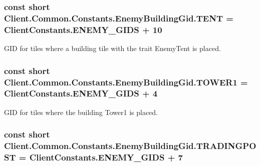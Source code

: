 \subsubsection[{T\+E\+N\+T}]{\setlength{\rightskip}{0pt plus 5cm}const short Client.\+Common.\+Constants.\+Enemy\+Building\+Gid.\+T\+E\+N\+T = {\bf Client\+Constants.\+E\+N\+E\+M\+Y\+\_\+\+G\+I\+D\+S} + 10}\label{classClient_1_1Common_1_1Constants_1_1EnemyBuildingGid_a296e67edf8d5e701bce6602512f1eb82}


G\+I\+D for tiles where a building tile with the trait Enemy\+Tent is placed. 

\hypertarget{classClient_1_1Common_1_1Constants_1_1EnemyBuildingGid_a895248f7ed0edbdb9109008ad0d69bac}{}
\subsubsection[{T\+O\+W\+E\+R1}]{\setlength{\rightskip}{0pt plus 5cm}const short Client.\+Common.\+Constants.\+Enemy\+Building\+Gid.\+T\+O\+W\+E\+R1 = {\bf Client\+Constants.\+E\+N\+E\+M\+Y\+\_\+\+G\+I\+D\+S} + 4}\label{classClient_1_1Common_1_1Constants_1_1EnemyBuildingGid_a895248f7ed0edbdb9109008ad0d69bac}


G\+I\+D for tiles where the building Tower1 is placed. 

\hypertarget{classClient_1_1Common_1_1Constants_1_1EnemyBuildingGid_a3814c240f70a153e7e024ece1ec1b3e2}{}
\subsubsection[{T\+R\+A\+D\+I\+N\+G\+P\+O\+S\+T}]{\setlength{\rightskip}{0pt plus 5cm}const short Client.\+Common.\+Constants.\+Enemy\+Building\+Gid.\+T\+R\+A\+D\+I\+N\+G\+P\+O\+S\+T = {\bf Client\+Constants.\+E\+N\+E\+M\+Y\+\_\+\+G\+I\+D\+S} + 7}\label{classClient_1_1Common_1_1Constants_1_1EnemyBuildingGid_a3814c240f70a153e7e024ece1ec1b3e2}


